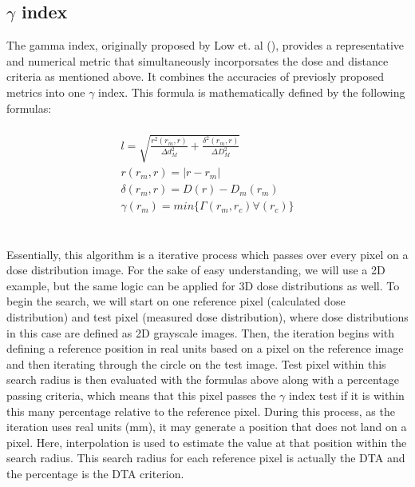 \documentclass[12pt]{article}
\begin{document}
\subsection{$\gamma$ index}
The gamma index, originally proposed by Low et. al (\textcite{Low}), provides a representative and numerical metric that simultaneously incorporsates the dose and distance criteria as mentioned above. It combines the accuracies of previosly proposed metrics into one $\gamma$ index. This formula is mathematically defined by the following formulas:
\\
\\
\begin{align}
  l = \sqrt{\frac{r^{2}(r_{m}, r)}{\Delta d^{2}_{M}} + \frac{\delta^{2}(r_{m}, r)}{\Delta D^{2}_{M}}} \\
  r(r_{m}, r) = \lvert r-r_{m} \lvert \\
  \delta(r_{m}, r) = D(r)-D_{m}(r_{m}) \\
  \gamma(r_{m}) = min\{\Gamma(r_{m}, r_{c})\forall(r_{c})\}
\end{align}
\\
\\
Essentially, this algorithm is a iterative process which passes over every pixel on a dose distribution image. For the sake of easy understanding, we will use a 2D example, but the same logic can be applied for 3D dose distributions as well. To begin the search, we will start on one reference pixel (calculated dose distribution) and test pixel (measured dose distribution), where dose distributions in this case are defined as 2D grayscale images. Then, the iteration begins with defining a reference position in real units based on a pixel on the reference image and then iterating through the circle on the test image. Test pixel within this search radius is then evaluated with the formulas above along with a percentage passing criteria, which means that this pixel passes the $\gamma$ index test if it is within this many percentage relative to the reference pixel. During this process, as the iteration uses real units (mm), it may generate a position that does not land on a pixel. Here, interpolation is used to estimate the value at that position within the search radius. This search radius for each reference pixel is actually the DTA and the percentage is the DTA criterion.
\end{document}
